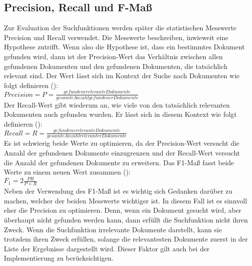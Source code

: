 \subsection{Precision, Recall und F-Maß}
Zur Evaluation der Suchfunktionen werden später die statistischen Messwerte Precision und Recall verwendet.
Die Messwerte beschreiben, inwieweit eine Hypothese zutrifft.
Wenn also die Hypothese ist, dass ein bestimmtes Dokument gefunden wird, dann ist der Precision-Wert das Verhältnis zwischen allen gefundenen Dokumenten und den gefundenen Dokumenten, die tatsächlich relevant sind.
Der Wert lässt sich im Kontext der Suche nach Dokumenten wie folgt definieren (\cite{Sirotkin_2012}):\\

\(Precision=P=\frac{gefundene relevante Dokumente}{gesamte Anzahl gefundener Dokumente} \)\\

Der Recall-Wert gibt wiederum an, wie viele von den tatsächlich relevanten Dokumenten auch gefunden wurden.
Er lässt sich in diesem Kontext wie folgt definieren (\cite{Sirotkin_2012}):\\

\(Recall=R=\frac{gefundene relevante Dokumente}{gesamte Anzahl relevanter Dokumente}\)\\

Es ist schwierig beide Werte zu optimieren, da der Precision-Wert versucht die Anzahl der gefundenen Dokumente einzugrenzen und der Recall-Wert versucht die Anzahl der gefundenen Dokumente zu erweitern.
Das F1-Maß fasst beide Werte zu einem neuen Wert zusammen (\cite{Sirotkin_2012}):\\

\(F_1=2\frac{PR}{P+R}\)\\

Neben der Verwendung des F1-Maß ist es wichtig sich Gedanken darüber zu machen, welcher der beiden Messwerte wichtiger ist.
In diesem Fall ist es sinnvoll eher die Precision zu optimieren.
Denn, wenn ein Dokument gesucht wird, aber überhaupt nicht gefunden werden kann, dann erfüllt die Suchfunktion nicht ihren Zweck.
Wenn die Suchfunktion irrelevante Dokumente darstellt, kann sie trotzdem ihren Zweck erfüllen, solange die relevantesten Dokumente zuerst in der Liste der Ergebnisse dargestellt wird.
Dieser Faktor gilt auch bei der Implementierung zu berücksichtigen.

